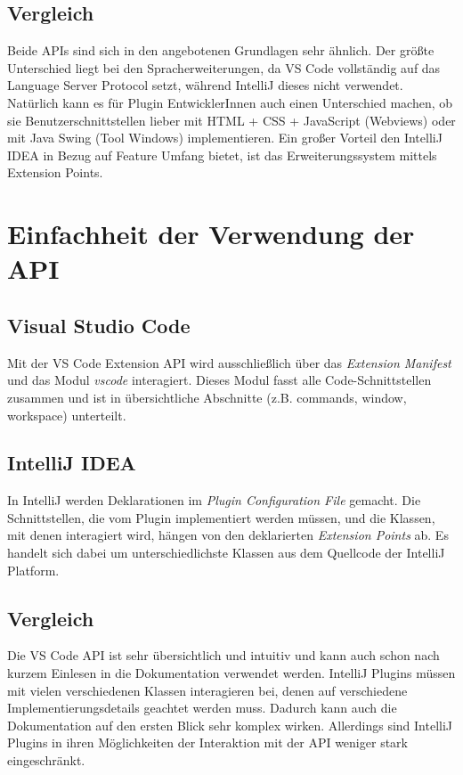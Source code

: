 \subsection{Vergleich}

Beide APIs sind sich in den angebotenen Grundlagen sehr ähnlich.
Der größte Unterschied liegt bei den Spracherweiterungen, da VS Code 
vollständig auf das Language Server Protocol setzt, während IntelliJ
dieses nicht verwendet. Natürlich kann es für Plugin EntwicklerInnen
auch einen Unterschied machen, ob sie Benutzerschnittstellen
lieber mit HTML + CSS + JavaScript (Webviews) oder
mit Java Swing (Tool Windows) implementieren. 
Ein großer Vorteil den IntelliJ IDEA in Bezug auf Feature Umfang
bietet, ist das Erweiterungssystem mittels Extension Points.


\section{Einfachheit der Verwendung der API}
\label{sec:Vergleich_Intuitivität}

\subsection{Visual Studio Code}

Mit der VS Code Extension API wird ausschließlich
über das \emph{Extension Manifest} und das Modul \emph{vscode} interagiert.
Dieses Modul fasst alle Code-Schnittstellen zusammen und ist
in übersichtliche Abschnitte (z.B. commands, window, workspace) unterteilt.

\subsection{IntelliJ IDEA}

In IntelliJ werden Deklarationen im \emph{Plugin Configuration File} gemacht.
Die Schnittstellen, die vom Plugin implementiert werden müssen, und
die Klassen, mit denen interagiert wird, hängen von den deklarierten
\emph{Extension Points} ab. Es handelt sich dabei um unterschiedlichste
Klassen aus dem Quellcode der IntelliJ Platform.

\subsection{Vergleich}

Die VS Code API ist sehr übersichtlich und intuitiv und kann auch
schon nach kurzem Einlesen in die Dokumentation verwendet werden.
IntelliJ Plugins müssen mit vielen verschiedenen Klassen interagieren
bei, denen auf verschiedene Implementierungsdetails geachtet werden muss.
Dadurch kann auch die Dokumentation auf den ersten Blick sehr komplex
wirken. Allerdings sind IntelliJ Plugins in ihren Möglichkeiten der
Interaktion mit der API weniger stark eingeschränkt.


